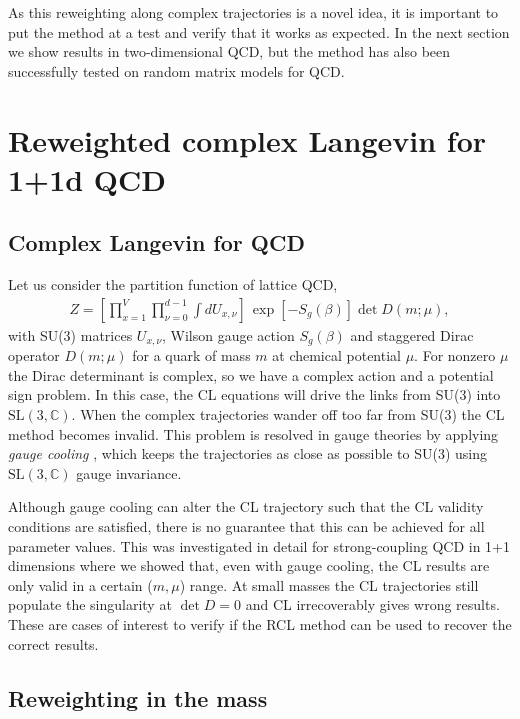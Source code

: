 \documentclass{PoS}
\def\sl3c{\text{SL}(3,\mathbb{C})}
\begin{document}
As this reweighting along complex trajectories is a novel idea, it is important to put the method at a test and verify that it works as expected. In the next section we show results in two-dimensional QCD, but the method has also been successfully tested on random matrix models for QCD.


\section{Reweighted complex Langevin for 1+1d QCD}
\label{QCD}

\subsection{Complex Langevin for QCD}

Let us consider the partition function of lattice QCD,
\begin{align}
Z=\left[\prod_{x=1}^V\prod_{\nu=0}^{d-1} \int\! d U_{x,\nu}\right]\, \exp[-S_g(\beta)] \det D(m;\mu) ,
\end{align}
with SU(3) matrices $U_{x,\nu}$, Wilson gauge action $S_g(\beta)$ and staggered Dirac operator $D(m;\mu)$ for a quark of mass $m$ at chemical potential $\mu$. For nonzero $\mu$ the Dirac determinant is complex, so we have a complex action and a potential sign problem. In this case, the CL equations will drive the links from SU(3) into $\sl3c$. When the complex trajectories wander off too far from SU(3) the CL method becomes invalid. This problem is resolved in gauge theories by applying \emph{gauge cooling} \cite{Seiler:2012wz}, which keeps the trajectories as close as possible to SU(3) using $\sl3c$ gauge invariance. 

Although gauge cooling can alter the CL trajectory such that the CL validity conditions are satisfied, there is no guarantee that this can be  achieved for all parameter values. This was investigated in detail for strong-coupling QCD in 1+1 dimensions \cite{Bloch:2015coa} where we showed that, even with gauge cooling, the CL results are only valid in a certain ($m,\mu$) range. At small masses the CL trajectories still populate the singularity at $\det D=0$ and CL irrecoverably gives wrong results.
These are cases of interest to verify if the RCL method can be used to recover the correct results.


\subsection{Reweighting in the mass}
\end{document}
